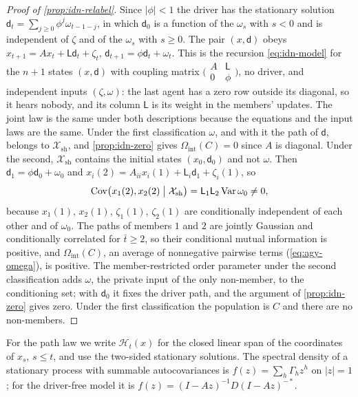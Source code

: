 \begin{proof}[Proof of \cref{prop:idn-relabel}]
Since $|\phi|<1$ the driver has the stationary solution $\mathsf d_t=\sum_{j\ge0}\phi^j\omega_{t-1-j}$, in which $\mathsf d_0$ is a function of the $\omega_s$ with $s<0$ and is independent of $\zeta$ and of the $\omega_s$ with $s\ge0$. The pair $(x,\mathsf d)$ obeys $x_{t+1}=Ax_t+\mathsf L\mathsf d_t+\zeta_t$, $\mathsf d_{t+1}=\phi\mathsf d_t+\omega_t$. This is the recursion \cref{eq:idn-model} for the $n+1$ states $(x,\mathsf d)$ with coupling matrix $\bigl(\begin{smallmatrix}A&\mathsf L\\0&\phi\end{smallmatrix}\bigr)$, no driver, and independent inputs $(\zeta,\omega)$: the last agent has a zero row outside its diagonal, so it hears nobody, and its column $\mathsf L$ is its weight in the members' updates. The joint law is the same under both descriptions because the equations and the input laws are the same. Under the first classification $\omega$, and with it the path of $\mathsf d$, belongs to $\mathcal X_{\mathrm{sh}}$, and \cref{prop:idn-zero} gives $\Omega_{\mathrm{int}}(C)=0$ since $A$ is diagonal. Under the second, $\mathcal X_{\mathrm{sh}}$ contains the initial states $(x_0,\mathsf d_0)$ and not $\omega$. Then $\mathsf d_1=\phi\mathsf d_0+\omega_0$ and $x_i(2)=A_{ii}x_i(1)+\mathsf L_i\mathsf d_1+\zeta_i(1)$, so
\begin{equation}\label{eq:idn-relabel}
\operatorname{Cov}\bigl(x_1(2),x_2(2)\bigm|\mathcal X_{\mathrm{sh}}\bigr)=\mathsf L_1\mathsf L_2\operatorname{Var}\omega_0\neq0,
\end{equation}
because $x_1(1)$, $x_2(1)$, $\zeta_1(1)$, $\zeta_2(1)$ are conditionally independent of each other and of $\omega_0$. The paths of members $1$ and $2$ are jointly Gaussian and conditionally correlated for $\bar t\ge2$, so their conditional mutual information is positive, and $\Omega_{\mathrm{int}}(C)$, an average of nonnegative pairwise terms (\cref{eq:agy-omega}), is positive. The member-restricted order parameter under the second classification adds $\omega$, the private input of the only non-member, to the conditioning set; with $\mathsf d_0$ it fixes the driver path, and the argument of \cref{prop:idn-zero} gives zero. Under the first classification the population is $C$ and there are no non-members.
\end{proof}

For the path law we write $\mathcal H_t(x)$ for the closed linear span of the coordinates of $x_s$, $s\le t$, and use the two-sided stationary solutions. The spectral density of a stationary process with summable autocovariances is $f(z)=\sum_h\Gamma_hz^h$ on $|z|=1$; for the driver-free model it is $f(z)=(I-Az)^{-1}D(I-Az)^{-*}$.

